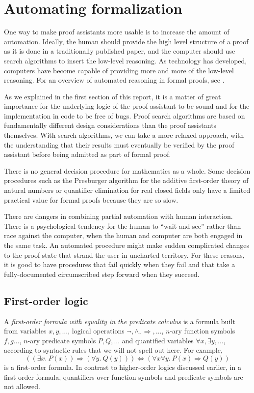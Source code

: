 \documentclass[brochure,english,12pt]{bourbaki}
\theoremstyle{plain}
\begin{document}
\section{Automating formalization}

One way to make proof assistants more usable is to increase the amount
of automation.  Ideally, the human should provide the high level
structure of a proof as it is done in a traditionally published paper,
and the computer should use search algorithms to insert the low-level
reasoning.  As technology has developed, computers have become capable
of providing more and more of the low-level reasoning.  For an
overview of automated reasoning in formal proofs, see \cite{Ha09}.


As we explained in the first section of this report, it is a matter of
great importance for the underlying logic of the proof assistant to
be sound and for the implementation in code to be free of bugs.  Proof
search algorithms are based on fundamentally different design
considerations than the proof assistants themselves.  With search
algorithms, we can take a more relaxed approach, with the
understanding that their results must eventually be verified by the
proof assistant before being admitted as part of formal proof.  

There is no general decision procedure for mathematics as a whole.
Some decision procedures such as the Presburger algorithm for the
additive first-order theory of natural numbers or quantifier
elimination for real closed fields only have a limited practical value
for formal proofs because they are so slow.

There are dangers in combining partial automation with human
interaction.  There is a psychological tendency for the human to
``wait and see'' rather than race against the computer, when the human
and computer are both engaged in the same task.  An automated
procedure might make sudden complicated changes to the proof state
that strand the user in uncharted territory.  For these reasons, it is
good to have procedures that fail quickly when they fail and that take
a fully-documented circumscribed step forward when they succeed.


\subsection{First-order logic}


A {\it first-order formula with equality in the predicate calculus} is
a formula built from variables $x,y,\ldots$, logical operations $\neg,
\land, \Rightarrow,\ldots$, $n$-ary function symbols $f,g\ldots$,
$n$-ary predicate symbols $P, Q,\ldots$ and quantified variables
$\forall x, \exists y,\ldots$, according to syntactic rules that we
will not spell out here.  For example,
\[
((\exists x.~P(x)) \Rightarrow (\forall y.~Q(y))) \Leftrightarrow (\forall x\forall y.~P(x)\Rightarrow Q(y))
\]
is a first-order formula.  In contrast to higher-order logics
discussed earlier, in a first-order formula, quantifiers over function
symbols and predicate symbols are not allowed.
\end{document}
